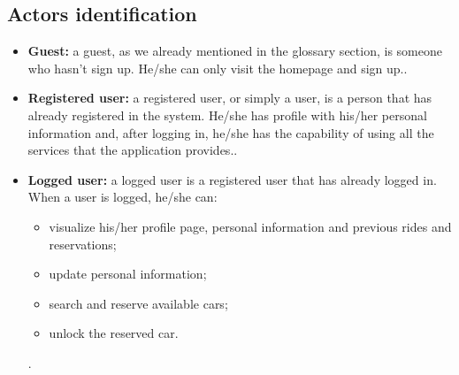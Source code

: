 \pagebreak
\subsection{Actors identification}

\newcommand{\actor}[2]{
	\item \textbf{#1:} #2.}

\begin{itemize}
	\actor {Guest}{a guest, as we already mentioned in the glossary section, is someone who hasn't sign up. He/she can only visit the homepage and sign up.}
	\actor{Registered user}{a registered user, or simply a user, is a person that has already registered in the system. He/she has profile with his/her personal information and, after logging in, he/she has the capability of using all the services that the application provides.}
	\actor{Logged user}{a logged user is a registered user that has already logged in. When a user is logged, he/she can:
		\begin{itemize}
			\item visualize his/her profile page, personal information and previous rides and reservations;
			\item update personal information;
			\item search and reserve available cars;
			\item unlock the reserved car.
		\end{itemize}
	}
\end{itemize}